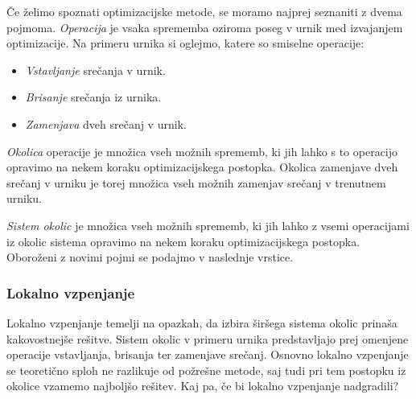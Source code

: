 \documentclass[a4paper,10pt]{article}
\begin{document}
Če želimo spoznati optimizacijske metode, se moramo najprej seznaniti z dvema pojmoma.
\emph{Operacija} je vsaka sprememba oziroma poseg v urnik med izvajanjem optimizacije.
Na primeru urnika si oglejmo, katere so smiselne operacije:
\begin{itemize}
   \item \emph{Vstavljanje} srečanja v urnik.
   \item \emph{Brisanje} srečanja iz urnika.
   \item \emph{Zamenjava} dveh srečanj v urnik.
\end{itemize}
\emph{Okolica} operacije je množica vseh možnih sprememb, ki jih lahko s to operacijo
opravimo na nekem koraku optimizacijskega postopka. Okolica zamenjave dveh srečanj v urniku
je torej množica vseh možnih zamenjav srečanj v trenutnem urniku.

\emph{Sistem okolic} je množica vseh možnih sprememb, ki jih lahko z vsemi operacijami iz
okolic sistema opravimo na nekem koraku optimizacijskega postopka. Oboroženi z novimi pojmi
se podajmo v naslednje vrstice.
\subsubsection{Lokalno vzpenjanje}
Lokalno vzpenjanje temelji na opazkah, da izbira širšega sistema okolic prinaša kakovostnejše
rešitve. Sistem okolic v primeru urnika predstavljajo prej omenjene operacije vstavljanja,
brisanja ter zamenjave srečanj. Osnovno lokalno vzpenjanje se teoretično sploh ne razlikuje
od požrešne metode, saj tudi pri tem postopku iz okolice vzamemo najboljšo rešitev. Kaj pa,
če bi lokalno vzpenjanje nadgradili?
\end{document}
